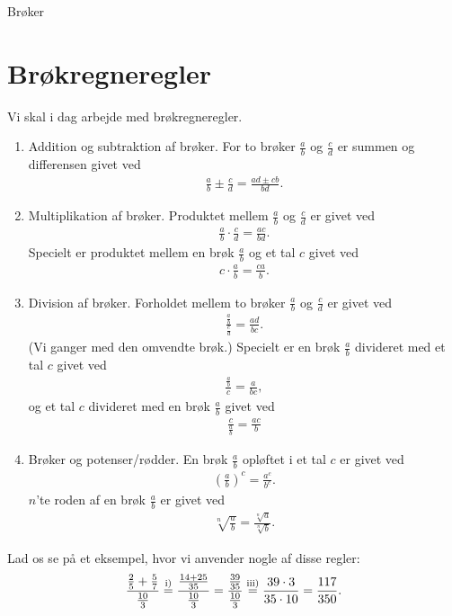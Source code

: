 
\begin{center}
\Huge
Brøker
\end{center}

\section*{Brøkregneregler}

Vi skal i dag arbejde med brøkregneregler.
\begin{enumerate}[label=\roman*)]
\item Addition og subtraktion af brøker. For to brøker $\frac{a}{b}$ og $\frac{c}{d}$ er summen og differensen givet ved
\begin{align*}
\frac{a}{b} \pm \frac{c}{d} = \frac{ad\pm cb}{bd}.
\end{align*}
\item Multiplikation af brøker. Produktet mellem $\frac{a}{b}$ og $\frac{c}{d}$ er givet ved
\begin{align*}
\frac{a}{b}\cdot \frac{c}{d} = \frac{ac}{bd}.
\end{align*}
Specielt er produktet mellem en brøk $\frac{a}{b}$ og et tal $c$ givet ved
\begin{align*}
c\cdot \frac{a}{b} = \frac{ca}{b}.
\end{align*}
\item Division af brøker. Forholdet mellem to brøker $\frac{a}{b}$ og $\frac{c}{d}$ er givet ved
\begin{align*}
\frac{\frac{a}{b}}{\frac{c}{d}} = \frac{ad}{bc}.
\end{align*}
(Vi ganger med den omvendte brøk.) Specielt er en brøk $\frac{a}{b}$ divideret med et tal $c$ givet ved
\begin{align*}
\frac{\frac{a}{b}}{c} = \frac{a}{bc},
\end{align*}
og et tal $c$ divideret med en brøk $\frac{a}{b}$ givet ved
\begin{align*}
\frac{c}{\frac{a}{b}} = \frac{ac}{b}
\end{align*}
\item Brøker og potenser/rødder. En brøk $\frac{a}{b}$ opløftet i et tal $c$ er givet ved 
\begin{align*}
\left(\frac{a}{b}\right)^{c} = \frac{a^c}{b^c}.
\end{align*}
$n$'te roden af en brøk $\frac{a}{b}$ er givet ved 
\begin{align*}
\sqrt[n]{\frac{a}{b}} = \frac{\sqrt[n]{a}}{\sqrt[n]{b}}.
\end{align*}
\end{enumerate}
\begin{exa}
Lad os se på et eksempel, hvor vi anvender nogle af disse regler:
\begin{align*}
\frac{\frac{2}{5}+\frac{5}{7}}{\frac{10}{3}} \overset{\textnormal{i)}}{=} \frac{\frac{14+25}{35}}{\frac{10}{3}} = \frac{\frac{39}{35}}{\frac{10}{3}} \overset{\textnormal{iii)}}{=} \frac{39\cdot 3}{35 \cdot 10} = \frac{117}{350}.
\end{align*}
\end{exa}

